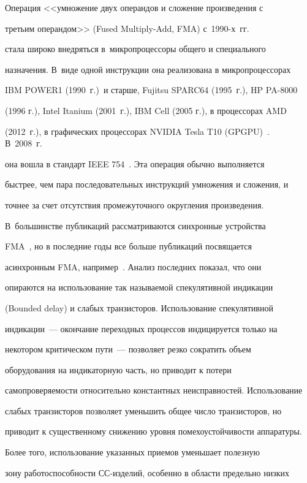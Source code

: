       Операция <<умножение двух операндов и сложение произведения с

третьим операндом>> (Fused Multiply-Add, FMA) с~1990-х~гг.\

стала широко внедряться в~микропроцессоры общего и специального

назначения. В~виде одной инструкции она реализована в микропроцессорах

IBM POWER1 (1990~г.)\ и старше, Fujitsu SPARC64 (1995~г.), HP PA-8000

(1996 г.), Intel Itanium (2001~г.), IBM Cell (2005 г.), в процессорах AMD

(2012~г.), в графических процессорах NVIDIA Tesla T10 (GPGPU)~\cite{5-st1}. В~2008~г.\

она вошла в стандарт IEEE 754~\cite{6-st1}. Эта операция обычно выполняется

быстрее, чем пара последовательных инструкций умножения и сложения, и

точнее за счет отсутствия промежуточного округления произведения.

В~большинстве публикаций рас\-смат\-ри\-ва\-ют\-ся синхронные устройства

      FMA~\cite{7-st1, 8-st1}, но в последние годы все больше публикаций посвящается

асинхронным FMA, например~\cite{9-st1, 10-st1}. Анализ последних показал, что они

опираются на использование так называемой спекулятивной индикации

(Bounded delay) и слабых транзисторов. Использование спекулятивной

индикации~--- окончание переходных процессов индицируется только на

некотором критическом пути~--- позволяет резко сократить объем

оборудования на индикаторную часть, но приводит к потери

самопроверяемости относительно константных неисправностей. Использование

слабых транзисторов позволяет уменьшить общее число транзисторов, но

приводит к существенному снижению уровня помехоустойчивости аппаратуры.



      Более того, использование указанных приемов уменьшает полезную

зону работоспособности СС-из\-де\-лий, особенно в области предельно низких

